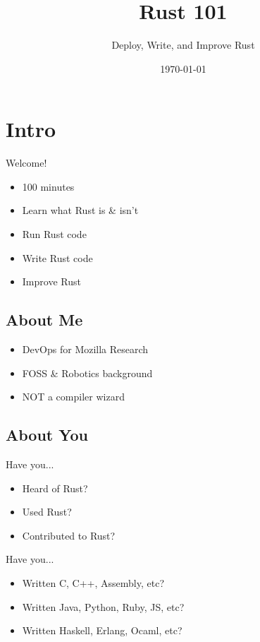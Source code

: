 \documentclass[xcolor={svgnames},hyperref]{beamer}
\title[Rust 101]{Rust 101}
\subtitle{Deploy, Write, and Improve Rust}
\author{\name}
\date{\today}
\begin{document}
\begin{frame}
\titlepage
\end{frame}

\section{Intro}

    \begin{frame}
        Welcome!
         \begin{itemize}
            \item 100 minutes
            \item Learn what Rust is \& isn't
            \item Run Rust code
            \item Write Rust code
            \item Improve Rust
        \end{itemize}
    \end{frame}

    \subsection{About Me}

    \begin{frame}
        \begin{itemize}
            \item DevOps for Mozilla Research
            \item FOSS \& Robotics background
            \item NOT a compiler wizard
        \end{itemize}
    \end{frame}


    \subsection{About You}

    \begin{frame}
        Have you...
        \begin{itemize}
            \item Heard of Rust?
            \item Used Rust?
            \item Contributed to Rust?
        \end{itemize}
    \end{frame}

    \begin{frame}
        Have you...
        \begin{itemize}
            \item Written C, C++, Assembly, etc?
            \item Written Java, Python, Ruby, JS, etc?
            \item Written Haskell, Erlang, Ocaml, etc?
        \end{itemize}
    \end{frame}
\end{document}
